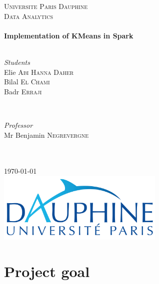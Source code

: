 \documentclass[english]{article}
\begin{document}
\begin{titlepage}
\SetDate[29/04/2018]
\newcommand{\HRule}{\rule{\linewidth}{0.5mm}}
\center 
\textsc{\LARGE Universite Paris Dauphine}\\[1.5cm] 
\textsc{\Large Data Analytics}\\[0.5cm]
\HRule \\[0.4cm] { \huge \bfseries
Implementation of KMeans in Spark}\\[0.4cm] \HRule \\[1.5cm]
\begin{minipage}{0.4\textwidth}
	\begin{flushleft} \large
		\emph{Students}
		\\ Elie \textsc{Abi Hanna Daher}
		\\ Bilal \textsc{El Chami}
		\\ Badr \textsc{Erraji}
	\end{flushleft}
\end{minipage}
~
\begin{minipage}{0.4\textwidth}
	\begin{flushright} \large
		\emph{Professor} 
		\\ Mr Benjamin \textsc{Negrevergne}
		\\  \hspace{1cm}
		\\  \hspace{1cm}
	\end{flushright}
\end{minipage}\\[2cm]
{\large \today}\\[2cm]
\includegraphics[width=8cm]{img/dauphine.png}
\vfill
\end{titlepage}
 
\tableofcontents 
\newpage

\section{Project goal}
\end{document}

